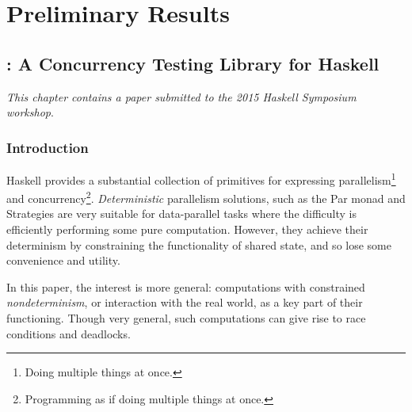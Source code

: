 \part{Preliminary Results}


\chapter{\dejafu{}: A Concurrency Testing Library for Haskell}
\label{chp:dejafu}

\textit{This chapter contains a paper submitted to the 2015 Haskell
  Symposium workshop}\cite{dejafu}.

\section{Introduction}
\label{sec:dejafu-intro}

Haskell provides a substantial collection of primitives for expressing
parallelism\footnote{Doing multiple things at once.} and
concurrency\footnote{Programming as if doing multiple things at
  once.}. \textit{Deterministic} parallelism solutions, such as the
Par monad\cite{parmonad} and Strategies\cite{strategies} are very
suitable for data-parallel tasks where the difficulty is efficiently
performing some pure computation. However, they achieve their
determinism by constraining the functionality of shared state, and so
lose some convenience and utility.

In this paper, the interest is more general: computations with
constrained \textit{nondeterminism}, or interaction with the real
world, as a key part of their functioning. Though very general, such
computations can give rise to race conditions and deadlocks.


